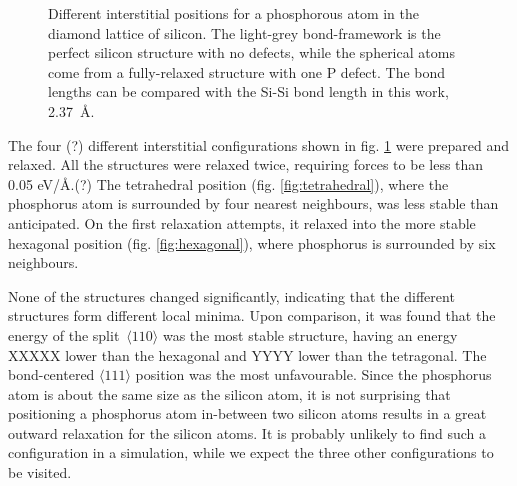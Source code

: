 \documentclass[11pt,bibliography=totoc,index=totoc]{scrbook}   %
\begin{document}
\begin{figure}[htbp]
  \caption{Different interstitial positions for a phosphorous atom in the diamond lattice of silicon. 
  The light-grey bond-framework is the perfect silicon structure with no defects, 
  while the spherical atoms come from a fully-relaxed structure with one P defect. 
  The bond lengths can be compared with the Si-Si bond length in this work, 2.37~Å. }
  \label{fig:interstitial_positions}
\end{figure}


The four (?) different interstitial configurations shown in fig. \ref{fig:interstitial_positions} were prepared and relaxed.
All the structures were relaxed twice, requiring forces to be less than 0.05 eV/Å.(?)
The tetrahedral position (fig. \ref{fig:tetrahedral}), where the phosphorus atom is surrounded by four nearest neighbours, 
was less stable than anticipated.
On the first relaxation attempts, it relaxed into the more stable hexagonal position (fig. \ref{fig:hexagonal}), where 
phosphorus is surrounded by six neighbours.

None of the structures changed significantly, indicating that the different structures form different local minima.
Upon comparison, it was found that the energy of the split~$\langle110\rangle$ was the most stable structure,
having an energy XXXXX lower than the hexagonal and YYYY lower than the tetragonal. The bond-centered $\langle 111 \rangle$
position was the most unfavourable. Since the phosphorus atom is about the same size as the silicon atom, it is not surprising that positioning a phosphorus atom in-between two silicon atoms results in a great outward relaxation for the silicon atoms. 
It is probably unlikely to find such a configuration in a simulation, while we expect the three other configurations to be visited.
\end{document}
